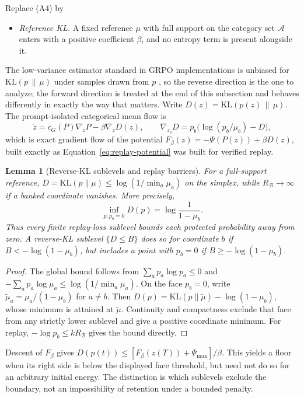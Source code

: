 \documentclass{article}
\newcommand{\enforcehalffinalproseline}{%
  \setlength{\parfillskip}{0pt plus .20\linewidth}}
\newcommand{\1}{\mathbf 1}
\newtheorem{lemma}{Lemma}[section]
\theoremstyle{remark}
\theoremstyle{definition}
\theoremstyle{plain}
\begin{document}
Replace (A4) by

\begin{itemize}
\item[(A4$'$)] \emph{Reference KL.} A fixed reference $\mu$ with full support
  on the category set $\mathcal A$ enters with a positive coefficient $\beta$,
  and no entropy term is present alongside it.
\end{itemize}
The low-variance estimator standard in GRPO implementations is unbiased for
$\mathrm{KL}(p\,\|\,\mu)$ under samples drawn from $p$
\citep{shao2024deepseekmath}, so the reverse direction is the one to analyze;
the forward direction is treated at the end of this subsection and behaves
differently in exactly the way that matters. Write
$D(z)=\mathrm{KL}(p(z)\,\|\,\mu)$. The prompt-isolated categorical mean flow is
\begin{equation}
  \dot z=c_G(P)\nabla_zP-\beta\nabla_zD(z),
  \qquad
  \nabla_{z_b}D=p_b\big(\log(p_b/\mu_b)-D\big),
  \label{eq:kl-mean-flow}
\end{equation}
which is exact gradient flow of the potential
$F_\beta(z)=-\Psi(P(z))+\beta D(z)$, built exactly as
Equation~\eqref{eq:replay-potential} was built for verified replay.

\begin{lemma}[Reverse-KL sublevels and replay barriers]
\enforcehalffinalproseline
\label{lem:kl-no-barrier}
For a full-support reference,
$D=\mathrm{KL}(p\|\mu)\le\log(1/\min_a\mu_a)$ on the simplex, while
$R_{\mathcal B}\to\infty$ if a banked coordinate vanishes. More precisely,
\[
 \inf_{p:p_b=0}D(p)=\log\frac1{1-\mu_b}.
\]
Thus every finite replay-loss sublevel bounds each protected probability
away from zero. A reverse-KL sublevel $\{D\le B\}$ does so for coordinate $b$
if $B<-\log(1-\mu_b)$, but includes a point with $p_b=0$ if
$B\ge-\log(1-\mu_b)$.
\end{lemma}
\begin{proof}
\enforcehalffinalproseline
The global bound follows from $\sum_ap_a\log p_a\le0$ and
$-\sum_ap_a\log\mu_a\le\log(1/\min_a\mu_a)$.
On the face $p_b=0$, write $\widetilde\mu_a=\mu_a/(1-\mu_b)$ for $a\ne b$.
Then $D(p)=\mathrm{KL}(p\|\widetilde\mu)-\log(1-\mu_b)$, whose minimum is
attained at $\widetilde\mu$. Continuity and compactness exclude that face
from any strictly lower sublevel and give a positive coordinate minimum.
For replay, $-\log p_b\le kR_{\mathcal B}$ gives the bound directly.
\end{proof}

Descent of $F_\beta$ gives
$D(p(t))\le [F_\beta(z(T))+\Psi_{\max}]/\beta$.
This yields a floor when its right side is below the displayed face
threshold, but need not do so for an arbitrary initial energy. The distinction
is which sublevels exclude the boundary, not an impossibility of retention
under a bounded penalty.
\end{document}
